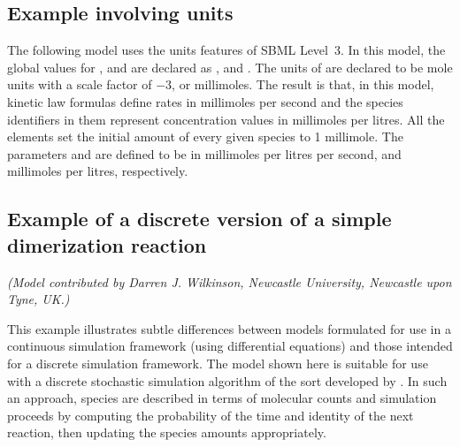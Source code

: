 \subsection{Example involving units}
\label{apdx:units-eg}

The following model uses the units features of SBML Level~3. In
this model, the global values for , 
and  are declared as ,  and
. The units of  are declared to 
be mole units with a scale factor of $-3$, or millimoles.  The result is that, in
this model, kinetic law formulas define rates in millimoles per
second and the species identifiers in them represent concentration
values in millimoles per litres.  All the  elements
set the initial amount of every given species to 1 millimole.  The
parameters  and  are defined to be in millimoles
per litres per second, and millimoles per litres, respectively.



\subsection{Example of a discrete version of a simple dimerization reaction}
\label{sec:discrete-eg}

\emph{(Model contributed by Darren J. Wilkinson, Newcastle
  University, Newcastle upon Tyne, UK.)}

This example illustrates subtle differences between models
formulated for use in a continuous simulation framework (\eg using
differential equations) and those intended for a discrete
simulation framework.  The model shown here is suitable for use
with a discrete stochastic simulation algorithm of the sort
developed by \cite{gillespie:1977}.  In such an approach, species
are described in terms of molecular counts and simulation
proceeds by computing the probability of the time and identity of
the next reaction, then updating the species amounts
appropriately.


